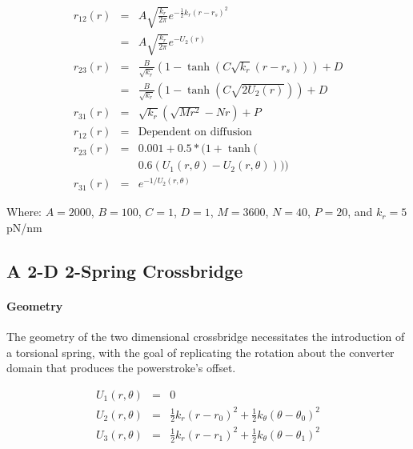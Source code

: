 \documentclass[]{article}
\begin{document}
\begin{eqnarray}  
\label{1sTransRates}
	r_{12}(r)   & = & A \sqrt{\frac{k_r}{2 \pi}} e^{-\frac{1}{2} k_r (r-r_s)^2} \nonumber \\
	            & = & A \sqrt{\frac{k_r}{2 \pi}} e^{-U_2(r)} \nonumber \\
    r_{23}(r)   & = & \frac{B}{\sqrt{k_r}} (1 - \tanh(C \sqrt{k_r} (r-r_s))) + D \\
                & = & \frac{B}{\sqrt{k_r}} (1 - \tanh(C \sqrt{2 U_2(r)})) + D \\
	r_{31}(r)   & = & \sqrt{k_r} (\sqrt{M r^2} - N r) + P \\
	r_{12}(r)   & = & \textrm{Dependent on diffusion} \nonumber \\
    r_{23}(r)   & = & 0.001 + 0.5 * (1 + \tanh( \nonumber \\
                        &   & 0.6 (U_1(r, \theta) - U_2(r, \theta)))) \\
	r_{31}(r)   & = & e^{-1 / U_2(r, \theta)}
\end{eqnarray} 
 
Where: $A = 2000$, $B = 100$, $C = 1$, $D = 1$, $M = 3600$, $N = 40$, $P = 20$, and $k_r = 5$ pN/nm



\subsection*{A 2-D 2-Spring Crossbridge}


\paragraph*{Geometry}

The geometry of the two dimensional crossbridge necessitates the introduction of a torsional spring, with the goal of replicating the rotation about the converter domain that produces the powerstroke's offset.


\begin{eqnarray}
\label{2sEnergy}
	U_1(r,\theta) & = & 0 \nonumber \\
    U_2(r,\theta) & = & \frac{1}{2}k_r (r - r_0)^2 + 
                        \frac{1}{2}k_\theta (\theta - \theta_0)^2 \nonumber \\
    U_3(r,\theta) & = & \frac{1}{2}k_r (r - r_1)^2 + 
                        \frac{1}{2}k_\theta (\theta - \theta_1)^2 \\
\end{eqnarray}
\end{document}
